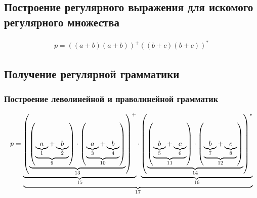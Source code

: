 \subsection{Построение регулярного выражения для искомого регулярного множества}
\begin{align}
	p=((a+b)(a+b))^+((b+c)(b+c))^*
\end{align}
\subsection{Получение регулярной грамматики}
\subsubsection{Построение леволинейной и праволинейной грамматик}
\begin{align}
	p=\ub{\ub{\rbr{\ub{
					\rbr{\ub{%
							\ub{a}_{1} + \ub{b}_{2}%
						}_{9}}
					\cdot
					\rbr{\ub{%
							\ub{a}_{3} + \ub{b}_{4}%
						}_{10}}}_{13}}^+}_{15}
		\cdot
		\ub{\rbr{\ub{\rbr{\ub{%
							\ub{b}_{5} + \ub{c}_{6}%
						}_{11}}
					\cdot
					\rbr{\ub{%
							\ub{b}_{7} + \ub{c}_{8}%
						}_{12}}}_{14}}^{*}}_{16}}_{17}
\end{align}
